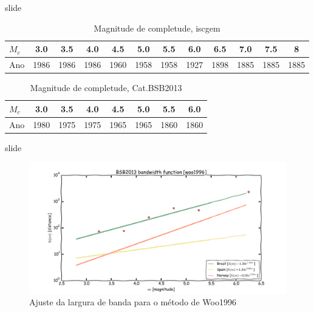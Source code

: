 \documentclass[ucs,8pt]{beamer}
\begin{document}
\begin{frame}{slide}

	\begin{table}[h]
	  	\centering
		\begin{tabular}{l|*{11}{c}}
		$M_c$ & 3.0  & 3.5  & 4.0  & 4.5  & 5.0  & 5.5  & 6.0  & 6.5  & 7.0  & 7.5  & 8 \\  \hline
		Ano   & 1986 & 1986 & 1986 & 1960 & 1958 & 1958 & 1927 & 1898 & 1885 & 1885 & 1885   \\
		\end{tabular}
		\caption{Magnitude de completude, \gls{iscgem}}
		\label{tab:mc_sa}
	\end{table}

	\begin{table}[h]
	  	\centering
		\begin{tabular}{l|*{7}{c}}
		$M_c$ & 3.0  & 3.5  & 4.0  & 4.5  & 5.0  & 5.5  & 6.0  \\  \hline
		Ano   & 1980 & 1975 & 1975 & 1965 & 1965 & 1860 & 1860 \\
		\end{tabular}
		\caption{Magnitude de completude, Cat.BSB2013}
		\label{tab:mc_br}
	\end{table}

\end{frame}



\begin{frame}{slide}


\begin{figure}[H]
  \centering
  \includegraphics[height=.80\textheight]{woo_bandwidth} 
  \caption{Ajuste da largura de banda para o método de Woo1996}
  \label{fig:woo_b} 
\end{figure}


\end{frame}
\end{document}
